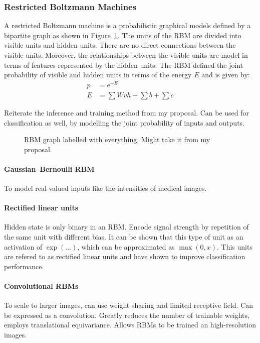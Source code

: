 \documentclass{report}
\begin{document}
\subsubsection{Restricted Boltzmann Machines}

A restricted Boltzmann machine is a probabilistic graphical models defined by a
bipartite graph as shown in Figure~\ref{fig:rbm}. The units of the RBM are
divided into visible units and hidden units. There are no direct connections
between the visible units. Moreover, the relationships between the visible units
are model in terms of features represented by the hidden units. The RBM defined
the joint probability of visible and hidden units in terms of the energy $E$ and
is given by:
\begin{align} 
p &= \text{e}^{-E} \\
E &= \sum Wvh + \sum b + \sum c
\end{align}

Reiterate the inference and training method from my proposal. Can be used for
classification as well, by modelling the joint probability of inputs and
outputs.

\begin{figure} 
\caption{RBM graph labelled with everything. Might take it from my proposal.}
\label{fig:rbm}
\end{figure}

\paragraph{Gaussian--Bernoulli RBM} To model real-valued inputs like the
intensities of medical images.

\paragraph{Rectified linear units} Hidden state is only binary in an RBM. Encode
signal strength by repetition of the same unit with different bias. It can be
shown that this type of unit as an activation of $\exp(...)$, which can be
approximated as $\max(0, x)$. This units are refered to as rectified linear
units and have shown to improve classification performance.

\paragraph{Convolutional RBMs} To scale to larger images, can use weight sharing
and limited receptive field. Can be expressed as a convolution. Greatly reduces
the number of trainable weights, employs translational equivariance. Allows RBMs
to be trained an high-resolution images.
\end{document}
